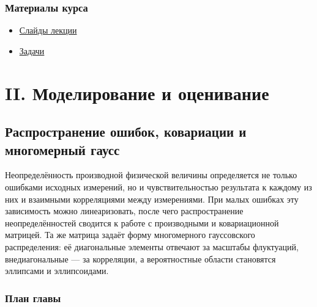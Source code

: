\documentclass[
  russian,
  12pt,
  a4paper,
  a4paper,
  openany]{scrbook}
\providecommand{\tightlist}{%
  \setlength{\itemsep}{0pt}\setlength{\parskip}{0pt}}
\begin{document}
\section{Материалы
курса}\label{ux43cux430ux442ux435ux440ux438ux430ux43bux44b-ux43aux443ux440ux441ux430-2}

\begin{itemize}
\tightlist
\item
  \href{https://neutrinohit.github.io/statistical-analysis-course/ru/slides/04_non_gaussian_clt_violations.html}{Слайды
  лекции}
\item
  \href{https://neutrinohit.github.io/statistical-analysis-course/ru/slides/exercises/04_non_gaussian_clt_violations_exercises.html}{Задачи}
\end{itemize}

\part{II. Моделирование и оценивание}

\chapter{Распространение ошибок, ковариации и многомерный
гаусс}\label{ux440ux430ux441ux43fux440ux43eux441ux442ux440ux430ux43dux435ux43dux438ux435-ux43eux448ux438ux431ux43eux43a-ux43aux43eux432ux430ux440ux438ux430ux446ux438ux438-ux438-ux43cux43dux43eux433ux43eux43cux435ux440ux43dux44bux439-ux433ux430ux443ux441ux441}

\begin{bookchapteropening}

Неопределённость производной физической величины определяется не только
ошибками исходных измерений, но и чувствительностью результата к каждому
из них и взаимными корреляциями между измерениями. При малых ошибках эту
зависимость можно линеаризовать, после чего распространение
неопределённостей сводится к работе с производными и ковариационной
матрицей. Та же матрица задаёт форму многомерного гауссовского
распределения: её диагональные элементы отвечают за масштабы флуктуаций,
внедиагональные --- за корреляции, а вероятностные области становятся
эллипсами и эллипсоидами.

\end{bookchapteropening}

\section{План
главы}\label{ux43fux43bux430ux43d-ux433ux43bux430ux432ux44b-4}
\end{document}
